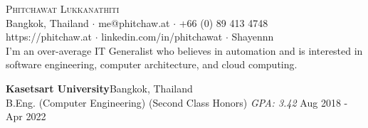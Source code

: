 \vspace*{-40pt}

    

\vspace*{-10pt}
\begin{center}
	{\Huge \scshape {Phitchawat Lukkanathiti}}\\
	\faMapMarker \vspace{0.4mm} Bangkok, Thailand $\cdot$ \faEnvelope \vspace{0.4mm} me@phitchaw.at $\cdot$ \faPhone \vspace{0.4mm} +66 (0) 89 413 4748 \\
  \faGlobe \vspace{0.4mm} https://phitchaw.at $\cdot$ \faLinkedinSquare \vspace{0.4mm} linkedin.com/in/phitchawat $\cdot$ \faGithub \vspace{0.4mm} Shayennn\\
\vspace{4mm}
        I'm an over-average IT Generalist who believes in automation and is interested in software engineering, computer architecture, and cloud computing.
\end{center}
\vspace{2mm}

\textbf{Kasetsart University}\hfill Bangkok, Thailand\\
B.Eng. (Computer Engineering) (Second Class Honors) \textit{GPA: 3.42} \hfill Aug 2018 - Apr 2022\\
\vspace{2mm}

\vspace{1mm}

